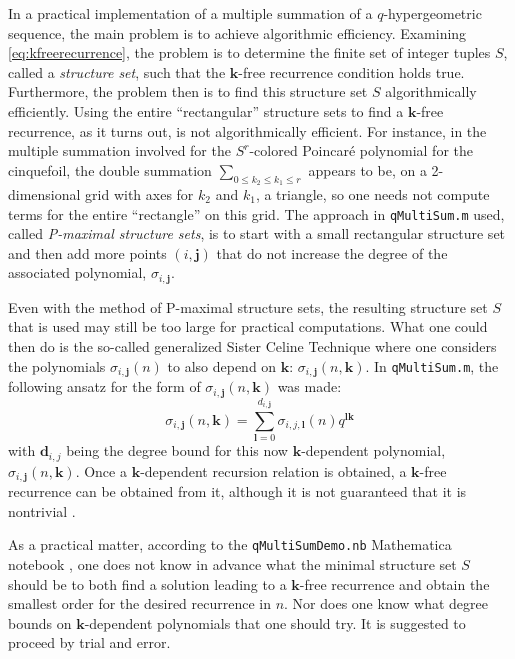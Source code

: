 \documentclass[a4paper,titlepage,twoside]{book}
\begin{document}
\begin{appendix}
In a practical implementation of a multiple summation of a $q$-hypergeometric sequence, the main problem is to achieve algorithmic efficiency.  Examining \eqref{eq:kfreerecurrence}, the problem is to determine the finite set of integer tuples $S$, called a \emph{structure set}, such that the $\mathbf{k}$-free recurrence condition holds true.  Furthermore, the problem then is to find this structure set $S$ algorithmically efficiently. Using the entire ``rectangular'' structure sets to find a $\mathbf{k}$-free recurrence, as it turns out, is not algorithmically efficient.  For instance, in the multiple summation involved for the $S^r$-colored Poincar\'{e} polynomial for the cinquefoil, the double summation $\sum_{ 0 \leq k_2 \leq k_1 \leq r}$ appears to be, on a 2-dimensional grid with axes for $k_2$ and $k_1$, a triangle, so one needs not compute terms for the entire ``rectangle'' on this grid.  The approach in \texttt{qMultiSum.m} used, called \emph{P-maximal structure sets}, is to start with a small rectangular structure set and then add more points $(i,\mathbf{j})$ that do not increase the degree of the associated polynomial, $\sigma_{i,\mathbf{j}}$.  

Even with the method of P-maximal structure sets, the resulting structure set $S$ that is used may still be too large for practical computations.  What one could then do is the so-called generalized Sister Celine Technique where one considers the polynomials $\sigma_{i,\mathbf{j}}{ (n)}$ to also depend on $\mathbf{k}$: $\sigma_{i,\mathbf{j}}{(n,\mathbf{k})}$.  In \texttt{qMultiSum.m}, the following ansatz for the form of $\sigma_{i,\mathbf{j}}{ (n,\mathbf{k})}$ was made:
\[
\sigma_{i,\mathbf{j}}{(n,\mathbf{k})} = \sum_{\mathbf{l}=0}^{ d_{i, \mathbf{j}}} \sigma_{i,j,\mathbf{l}}{ (n)} q^{ \mathbf{lk} }
\]
with $\mathbf{d}_{i,j}$ being the degree bound for this now $\mathbf{k}$-dependent polynomial, $\sigma_{i,\mathbf{j}}{ (n,\mathbf{k})}$.  Once a $\mathbf{k}$-dependent recursion relation is obtained, a $\mathbf{k}$-free recurrence can be obtained from it, although it is not guaranteed that it is nontrivial \cite{RieseqMultiSum}.  

As a practical matter, according to the \texttt{qMultiSumDemo.nb} Mathematica notebook \cite{RieseqZeil}, one does not know in advance what the minimal structure set $S$ should be to both find a solution leading to a $\mathbf{k}$-free recurrence and obtain the smallest order for the desired recurrence in $n$.  Nor does one know what degree bounds on $\mathbf{k}$-dependent polynomials that one should try.  It is suggested to proceed by trial and error.


\end{appendix}
\end{document}
